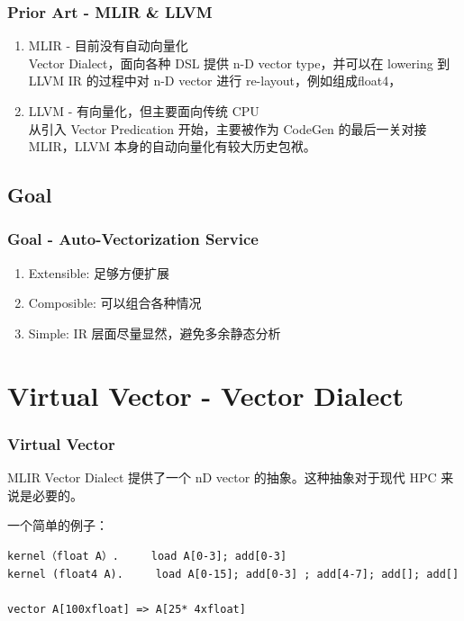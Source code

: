\documentclass[aspectratio=169]{ctexbeamer}
\begin{document}
\begin{frame}
    \frametitle{Prior Art - MLIR \& LLVM}

    \begin{enumerate}
        \item MLIR - 目前没有自动向量化 \\
              Vector Dialect，面向各种 DSL 提供 n-D vector type，并可以在 lowering 到 LLVM IR 的过程中对 n-D vector 进行 re-layout，例如组成float4，
        \item LLVM - 有向量化，但主要面向传统 CPU \\
              从引入 Vector Predication 开始，主要被作为 CodeGen 的最后一关对接 MLIR，LLVM 本身的自动向量化有较大历史包袱。
    \end{enumerate}
\end{frame}

\subsection{Goal}

\begin{frame}
    \frametitle{Goal - Auto-Vectorization Service}

    \begin{enumerate}
        \item Extensible: 足够方便扩展
        \item Composible: 可以组合各种情况
        \item Simple: IR 层面尽量显然，避免多余静态分析
    \end{enumerate}
\end{frame}

\section{Virtual Vector - Vector Dialect}

\begin{frame}[fragile]
    \frametitle{Virtual Vector}

    MLIR Vector Dialect 提供了一个 nD vector 的抽象。这种抽象对于现代 HPC 来说是必要的。

    一个简单的例子：

    \begin{lstlisting}
kernel（float A）.     load A[0-3]; add[0-3]
kernel (float4 A).     load A[0-15]; add[0-3] ; add[4-7]; add[]; add[]

vector A[100xfloat] => A[25* 4xfloat]
    \end{lstlisting}

\end{frame}
\end{document}

